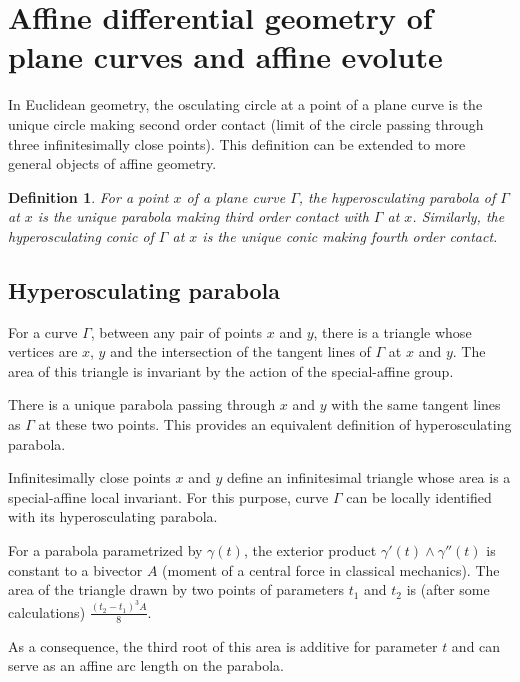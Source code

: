 \documentclass[reqno]{amsart}
\newtheorem{definition}{Definition}
\theoremstyle{definition}
\theoremstyle{remark}
\theoremstyle{definition}
\theoremstyle{definition}
\theoremstyle{definition}
\begin{document}
\section{Affine differential geometry of plane curves and affine evolute}\label{sec:aff}

In Euclidean geometry, the osculating circle at a point of a plane curve is the unique circle making second order contact (limit of the circle passing through three infinitesimally close points). This definition can be extended to more general objects of affine geometry.

\begin{definition}
For a point $x$ of a plane curve $\Gamma$, the \textit{hyperosculating parabola} of $\Gamma$ at $x$ is the unique parabola making third order contact with $\Gamma$ at $x$. Similarly, the \textit{hyperosculating conic} of $\Gamma$ at $x$ is the unique conic making fourth order contact.
\end{definition}

\subsection{Hyperosculating parabola}

For a curve $\Gamma$, between any pair of points $x$ and $y$, there is a triangle whose vertices are $x$, $y$ and the intersection of the tangent lines of $\Gamma$ at $x$ and $y$. The area of this triangle is invariant by the action of the special-affine group.

There is a unique parabola passing through $x$ and $y$ with the same tangent lines as $\Gamma$ at these two points. This provides an equivalent definition of hyperosculating parabola.

Infinitesimally close points $x$ and $y$ define an infinitesimal triangle whose area is a special-affine local invariant. For this purpose, curve $\Gamma$ can be locally identified with its hyperosculating parabola.

For a parabola parametrized by $\gamma(t)$, the exterior product $\gamma'(t) \wedge \gamma''(t)$ is constant to a bivector $A$ (moment of a central force in classical mechanics). The area of the triangle drawn by two points of parameters $t_{1}$ and $t_{2}$ is (after some calculations) $\frac{(t_{2}-t_{1})^{3}A}{8}$.

As a consequence, the third root of this area is additive for parameter $t$ and can serve as an affine arc length on the parabola.
\end{document}
